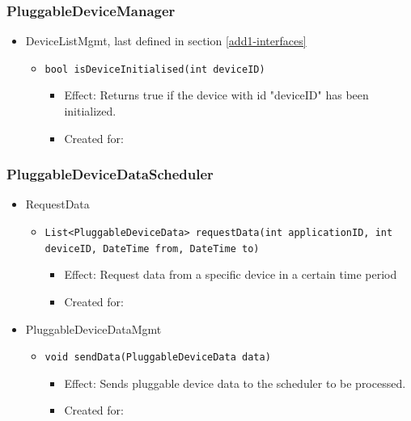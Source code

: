     \subsubsection{PluggableDeviceManager}
        \begin{itemize}
        	\item DeviceListMgmt, last defined in section \ref{add1-interfaces}
        	\begin{itemize}
        		\item \texttt{bool isDeviceInitialised(int deviceID)}
        		\begin{itemize}
        			\item Effect: Returns true if the device with id "deviceID" has been initialized.
        			\item Created for:
        		\end{itemize}
        	\end{itemize}
        \end{itemize}

    \subsubsection{PluggableDeviceDataScheduler}
        \begin{itemize}
            \item RequestData
            \begin{itemize}
                \item \texttt{List<PluggableDeviceData> requestData(int applicationID, int deviceID, DateTime from, DateTime to)}
                \begin{itemize}
                    \item Effect: Request data from a specific device in a certain time period
                    \item Created for:
                \end{itemize}
            \end{itemize}

            \item PluggableDeviceDataMgmt
            \begin{itemize}
                \item \texttt{void sendData(PluggableDeviceData data)}
                \begin{itemize}
                    \item Effect: Sends pluggable device data to the scheduler to be processed.
                    \item Created for:
                \end{itemize}
            \end{itemize}
        \end{itemize}

